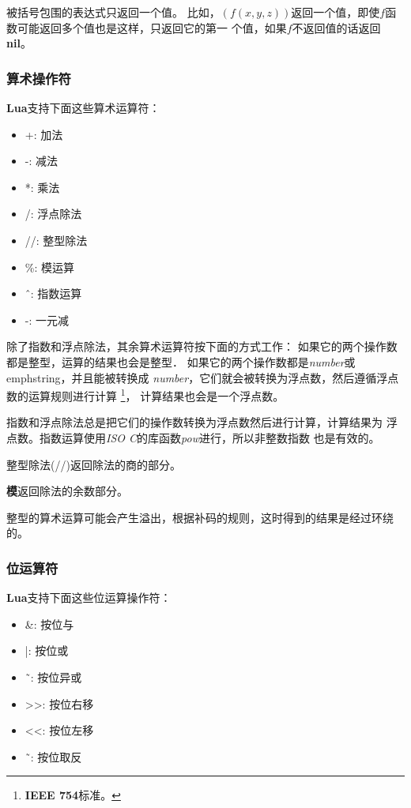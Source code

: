 \documentclass{ctexart}
\begin{document}
被括号包围的表达式只返回一个值。
比如，$(f(x,y,z))$返回一个值，即使$f$函数可能返回多个值也是这样，只返回它的第一
个值，如果$f$不返回值的话返回\textbf{nil}。

\subsubsection{算术操作符}

\textbf{Lua}支持下面这些算术运算符：

\begin{itemize}
\item +: 加法
\item -: 减法
\item *: 乘法
\item /: 浮点除法
\item //: 整型除法
\item \%: 模运算
\item \^\ : 指数运算
\item -: 一元减
\end{itemize}

除了指数和浮点除法，其余算术运算符按下面的方式工作：
如果它的两个操作数都是整型，运算的结果也会是整型．
如果它的两个操作数都是\emph{number}或emph{string}，并且能被转换成
\emph{number}，它们就会被转换为浮点数，然后遵循浮点数的运算规则进行计算
\footnote{\textbf{IEEE 754}标准。}，
计算结果也会是一个浮点数。

指数和浮点除法总是把它们的操作数转换为浮点数然后进行计算，计算结果为
浮点数。指数运算使用\emph{ISO C}的库函数\emph{pow}进行，所以非整数指数
也是有效的。

整型除法(//)返回除法的商的部分。

\textbf{模}返回除法的余数部分。

整型的算术运算可能会产生溢出，根据补码的规则，这时得到的结果是经过环绕的。

\subsubsection{位运算符}

\textbf{Lua}支持下面这些位运算操作符：

\begin{itemize}
\item \&: 按位与
\item |: 按位或
\item \~\ : 按位异或
\item >>: 按位右移
\item <<: 按位左移
\item \~\ : 按位取反
\end{itemize}
\end{document}
